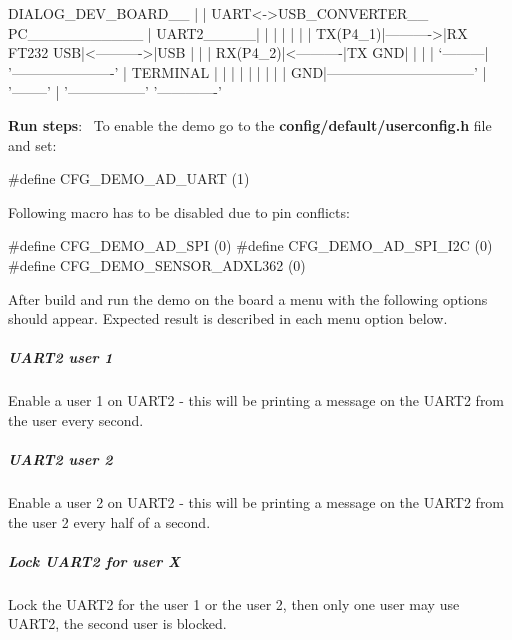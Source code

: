 \begin{DoxyPre}
   DIALOG\_DEV\_BOARD\_\_
   |                 |            UART<->USB\_CONVERTER\_\_              PC\_\_\_\_\_\_\_\_\_\_\_
   |       UART2\_\_\_\_\_|           |                      |            |             |
   |       | TX(P4\_1)|---------->|RX      FT232      USB|<---------->|USB          |
   |       | RX(P4\_2)|<----------|TX                 GND|            |             |
   |       `---------|           '----------------------'            |   TERMINAL  |
   |                 |                                |              |  |        | |
   |              GND|--------------------------------'              |  '--------' |
   '-----------------'                                               '-------------'
\end{DoxyPre}



\begin{DoxyItemize}
\item {\bfseries Run steps}\+:~\newline
 To enable the demo go to the {\bfseries {\ttfamily config/default/userconfig.\+h}} file and set\+: 
\begin{DoxyCode}
\textcolor{preprocessor}{#define CFG\_DEMO\_AD\_UART        (1)}
\end{DoxyCode}
 Following macro has to be disabled due to pin conflicts\+: 
\begin{DoxyCode}
\textcolor{preprocessor}{#define CFG\_DEMO\_AD\_SPI         (0)}
\textcolor{preprocessor}{#define CFG\_DEMO\_AD\_SPI\_I2C     (0)}
\textcolor{preprocessor}{#define CFG\_DEMO\_SENSOR\_ADXL362 (0)}
\end{DoxyCode}
 After build and run the demo on the board a menu with the following options should appear. Expected result is described in each menu option below.
\end{DoxyItemize}

\subparagraph*{U\+A\+R\+T2 user 1}

Enable a user 1 on U\+A\+R\+T2 -\/ this will be printing a message on the U\+A\+R\+T2 from the user every second.

\subparagraph*{U\+A\+R\+T2 user 2}

Enable a user 2 on U\+A\+R\+T2 -\/ this will be printing a message on the U\+A\+R\+T2 from the user 2 every half of a second.

\subparagraph*{Lock U\+A\+R\+T2 for user X}

Lock the U\+A\+R\+T2 for the user 1 or the user 2, then only one user may use U\+A\+R\+T2, the second user is blocked.

